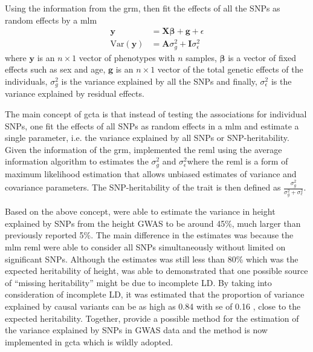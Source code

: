 	Using the information from the \gls{grm}, \citet{Yang2011} then fit the effects of all the \glspl{SNP} as random effects by a \gls{mlm}
	\begin{align}
	\boldsymbol{y} &= \boldsymbol{X\beta}+\boldsymbol{g}+\epsilon\\
	\mathrm{Var}(\boldsymbol{y}) &= \boldsymbol{A}\sigma_g^2+\boldsymbol{I}\sigma_\epsilon^2
	\end{align}
	where $\boldsymbol{y}$ is an $n\times 1$ vector of phenotypes with $n$ samples, $\boldsymbol{\beta}$ is a vector of fixed effects such as sex and age, $\boldsymbol{g}$ is an $n\times 1$ vector of the total genetic effects of the individuals, $\sigma_g^2$ is the variance explained by all the \glspl{SNP} and finally, $\sigma_\epsilon^2$ is the variance explained by residual effects.

	The main concept of \gls{gcta} is that instead of testing the associations for individual \glspl{SNP}, one fit the effects of all \glspl{SNP} as random effects in a \gls{mlm} and estimate a single parameter, i.e. the variance explained by all \glspl{SNP} or \gls{SNP}-heritability.
	Given the information of the \gls{grm}, \citet{Yang2011} implemented the \gls{reml} using the average information algorithm to estimates the $\sigma_g^2$ and $\sigma_\epsilon^2$where the \gls{reml} is a form of maximum likelihood estimation that allows unbiased estimates of variance and covariance parameters.
	The \gls{SNP}-heritability of the trait is then defined as $\frac{\sigma_g^2}{\sigma_g^2+\sigma_e^2}$.

	Based on the above concept, \citet{Yang2010a} were able to estimate the variance in height explained by \glspl{SNP} from the height \gls{GWAS} to be around 45\%, much larger than previously reported 5\%.
	The main difference in the estimates was because the \gls{mlm} \gls{reml} were able to consider all \glspl{SNP} simultaneously without limited on significant \glspl{SNP}.
	Although the estimates was still less than 80\% which was the expected heritability of height, \citet{Yang2010a} was able to demonstrated that one possible source of ``missing heritability'' might be due to incomplete \gls{LD}.
	By taking into consideration of incomplete \gls{LD}, it was estimated that the proportion of variance explained by causal variants can be as high as 0.84 with \gls{se} of 0.16 \citep{Yang2010a}, close to the expected heritability.
	Together, \citet{Yang2011} provide a possible method for the estimation of the variance explained by \glspl{SNP} in \gls{GWAS} data and the method is now implemented in \gls{gcta} which is wildly adopted.
	

